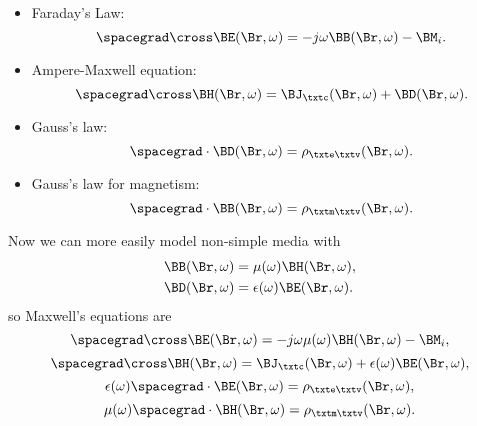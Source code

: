 \begin{itemize}
\item Faraday's Law:
\begin{equation}\label{eqn:emtLecture5:640}
\spacegrad \cross \BE( \Br, \omega ) = - j \omega \BB(\Br, \omega) - \BM_i.
\end{equation}
\item Ampere-Maxwell equation:
\begin{equation}\label{eqn:emtLecture5:660}
\spacegrad \cross \BH( \Br, \omega ) = \BJ_\txtc(\Br, \omega) + \BD(\Br, \omega).
\end{equation}
\item Gauss's law:
\begin{equation}\label{eqn:emtLecture5:680}
\spacegrad \cdot \BD(\Br, \omega) = \rho_{\txte\txtv}(\Br, \omega).
\end{equation}
\item Gauss's law for magnetism:
\begin{equation}\label{eqn:emtLecture5:700}
\spacegrad \cdot \BB(\Br, \omega) = \rho_{\txtm\txtv}(\Br, \omega).
\end{equation}
\end{itemize}
%
Now we can more easily model non-simple media with
%
\begin{equation}\label{eqn:emtLecture5:740}
\begin{aligned}
\BB(\Br, \omega) &= \mu(\omega) \BH(\Br, \omega), \\
\BD(\Br, \omega) &= \epsilon(\omega) \BE(\Br, \omega).
\end{aligned}
\end{equation}
%
so Maxwell's equations are
%
\begin{dmath}\label{eqn:emtLecture5:760}
\spacegrad \cross \BE( \Br, \omega ) = - j \omega \mu(\omega) \BH(\Br, \omega) - \BM_i,
\end{dmath}
\begin{dmath}\label{eqn:emtLecture5:780}
\spacegrad \cross \BH( \Br, \omega ) = \BJ_\txtc(\Br, \omega) + \epsilon(\omega) \BE(\Br, \omega),
\end{dmath}
\begin{dmath}\label{eqn:emtLecture5:800}
\epsilon(\omega) \spacegrad \cdot \BE(\Br, \omega) = \rho_{\txte\txtv}(\Br, \omega),
\end{dmath}
\begin{dmath}\label{eqn:emtLecture5:820}
\mu(\omega) \spacegrad \cdot \BH(\Br, \omega) = \rho_{\txtm\txtv}(\Br, \omega).
\end{dmath}
%
